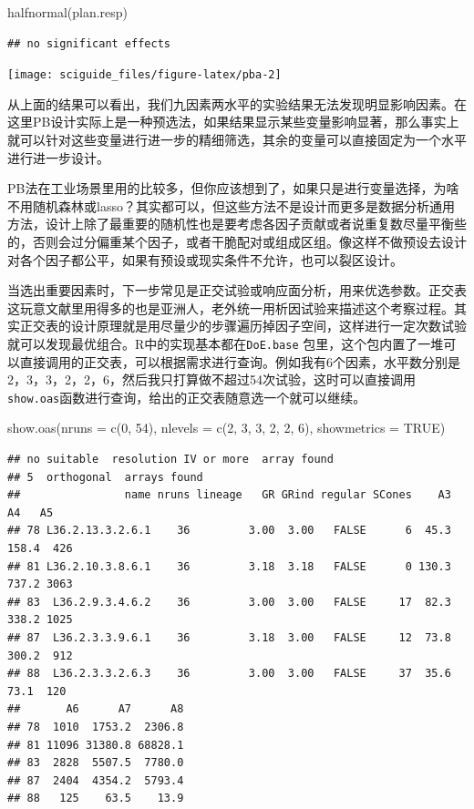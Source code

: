 \documentclass[]{tufte-book}
\newenvironment{Shaded}{}{}
\newcommand{\AttributeTok}[1]{\textcolor[rgb]{0.49,0.56,0.16}{#1}}
\newcommand{\ConstantTok}[1]{\textcolor[rgb]{0.53,0.00,0.00}{#1}}
\newcommand{\DecValTok}[1]{\textcolor[rgb]{0.25,0.63,0.44}{#1}}
\newcommand{\FunctionTok}[1]{\textcolor[rgb]{0.02,0.16,0.49}{#1}}
\newcommand{\NormalTok}[1]{#1}
\begin{document}
\begin{Shaded}
\begin{Highlighting}[]
\FunctionTok{halfnormal}\NormalTok{(plan.resp)}
\end{Highlighting}
\end{Shaded}

\begin{verbatim}
## no significant effects
\end{verbatim}

\texttt{[image: sciguide\_files/figure-latex/pba-2]}

从上面的结果可以看出，我们九因素两水平的实验结果无法发现明显影响因素。在这里PB设计实际上是一种预选法，如果结果显示某些变量影响显著，那么事实上就可以针对这些变量进行进一步的精细筛选，其余的变量可以直接固定为一个水平进行进一步设计。

PB法在工业场景里用的比较多，但你应该想到了，如果只是进行变量选择，为啥不用随机森林或lasso？其实都可以，但这些方法不是设计而更多是数据分析通用方法，设计上除了最重要的随机性也是要考虑各因子贡献或者说重复数尽量平衡些的，否则会过分偏重某个因子，或者干脆配对或组成区组。像这样不做预设去设计对各个因子都公平，如果有预设或现实条件不允许，也可以裂区设计。

当选出重要因素时，下一步常见是正交试验或响应面分析，用来优选参数。正交表这玩意文献里用得多的也是亚洲人，老外统一用析因试验来描述这个考察过程。其实正交表的设计原理就是用尽量少的步骤遍历掉因子空间，这样进行一定次数试验就可以发现最优组合。R中的实现基本都在\texttt{DoE.base} 包里，这个包内置了一堆可以直接调用的正交表，可以根据需求进行查询。例如我有6个因素，水平数分别是2，3，3，2，2，6，然后我只打算做不超过54次试验，这时可以直接调用\texttt{show.oas}函数进行查询，给出的正交表随意选一个就可以继续。

\begin{Shaded}
\begin{Highlighting}[]
\FunctionTok{show.oas}\NormalTok{(}\AttributeTok{nruns =} \FunctionTok{c}\NormalTok{(}\DecValTok{0}\NormalTok{, }\DecValTok{54}\NormalTok{), }\AttributeTok{nlevels =} \FunctionTok{c}\NormalTok{(}\DecValTok{2}\NormalTok{, }\DecValTok{3}\NormalTok{, }\DecValTok{3}\NormalTok{, }\DecValTok{2}\NormalTok{, }\DecValTok{2}\NormalTok{, }\DecValTok{6}\NormalTok{), }\AttributeTok{showmetrics =} \ConstantTok{TRUE}\NormalTok{)}
\end{Highlighting}
\end{Shaded}

\begin{verbatim}
## no suitable  resolution IV or more  array found
## 5  orthogonal  arrays found
##                name nruns lineage   GR GRind regular SCones    A3    A4   A5
## 78 L36.2.13.3.2.6.1    36         3.00  3.00   FALSE      6  45.3 158.4  426
## 81 L36.2.10.3.8.6.1    36         3.18  3.18   FALSE      0 130.3 737.2 3063
## 83  L36.2.9.3.4.6.2    36         3.00  3.00   FALSE     17  82.3 338.2 1025
## 87  L36.2.3.3.9.6.1    36         3.18  3.00   FALSE     12  73.8 300.2  912
## 88  L36.2.3.3.2.6.3    36         3.00  3.00   FALSE     37  35.6  73.1  120
##       A6      A7      A8
## 78  1010  1753.2  2306.8
## 81 11096 31380.8 68828.1
## 83  2828  5507.5  7780.0
## 87  2404  4354.2  5793.4
## 88   125    63.5    13.9
\end{verbatim}
\end{document}
